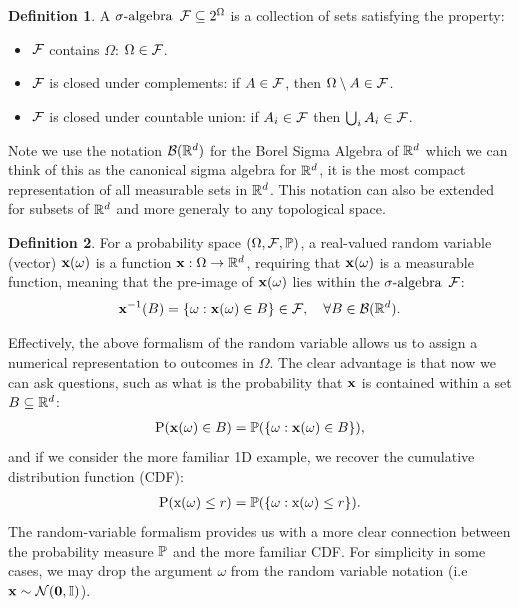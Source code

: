 \documentclass[a4paper,12pt,twoside,openright]{report}
\theoremstyle{definition}
\newtheorem{definition}{Definition}[section]
\begin{document}
\begin{definition}\label{def:sigma_algebra}
A $\sigalg$ $\calF \subseteq 2^{\Omega}$ is a collection of sets satisfying the property:
\begin{itemize}
    \item $\calF$ contains $\Omega$: $\Omega \in \calF$.
    \item $\calF$ is closed under complements: if $A\in\calF$, then $\Omega \setminus A \in \calF$.
    \item $\calF$ is closed under countable union:  if $A_i \in \calF$ then $\bigcup_i A_i \in \calF$.
\end{itemize}
\end{definition}

Note we use the notation $\calB(\R^d)$ for the Borel Sigma Algebra of $\R^d$ which we can think of this as the canonical sigma algebra for $\R^d$, it is the most compact representation of all measurable sets in $\R^d$. This notation can also be extended for subsets of $\R^d$ and more generaly to any topological space.

\begin{definition}\label{def:random_variable}
For a probability space $\probspace$, a real-valued random variable (vector) $\rvx(\omega)$ is a function $\rvx :\Omega \rightarrow \R^d$, requiring that $\rvx(\omega)$ is a measurable function, meaning that the pre-image of $\rvx(\omega)$  lies within the $\sigalg$ $\calF$:
\begin{align*}
    \rvx^{-1}(B)= \{\omega : \rvx(\omega) \in B \} \in \calF, \quad \forall B \in \calB(\R^d).
\end{align*}
\end{definition}
Effectively, the above formalism of the random variable allows us to assign a numerical representation to outcomes in $\Omega$. The clear advantage is that now we can ask questions, such as what is the probability that $\rvx$ is contained within a set $B \subseteq \R^d$:
\begin{align*}
     \text{P}(\rvx(\omega) \in B) = \P( \{\omega : \rvx(\omega) \in B \} ),
\end{align*}
 and if we consider the more familiar 1D example, we recover the cumulative distribution function (CDF):
 \begin{align*}
     \text{P}(\rx(\omega) \leq r) = \P( \{\omega : \rx(\omega) \leq r \} ).
 \end{align*}
 The random-variable formalism provides us with a more clear connection between the probability measure $\P$ and the more familiar CDF. For simplicity in some cases, we may drop the argument $\omega$ from the random variable notation (i.e $\rvx \sim \calN(\bm{0}, \mathbb{I})$). 
\end{document}
